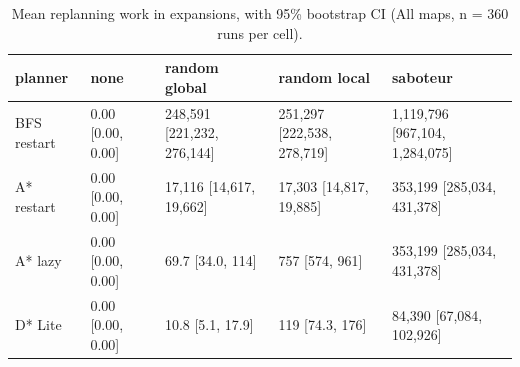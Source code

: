 \begin{table}[t]
\centering
\small
\caption{Mean replanning work in expansions, with 95\% bootstrap CI (All maps, n = 360 runs per cell).}
\label{tab:replan-all}
\begin{tabular}{lllll}
\toprule
planner & none & random global & random local & saboteur \\
\midrule
BFS restart & 0.00 [0.00, 0.00] & 248,591 [221,232, 276,144] & 251,297 [222,538, 278,719] & 1,119,796 [967,104, 1,284,075] \\
A* restart & 0.00 [0.00, 0.00] & 17,116 [14,617, 19,662] & 17,303 [14,817, 19,885] & 353,199 [285,034, 431,378] \\
A* lazy & 0.00 [0.00, 0.00] & 69.7 [34.0, 114] & 757 [574, 961] & 353,199 [285,034, 431,378] \\
D* Lite & 0.00 [0.00, 0.00] & 10.8 [5.1, 17.9] & 119 [74.3, 176] & 84,390 [67,084, 102,926] \\
\bottomrule
\end{tabular}
\end{table}
